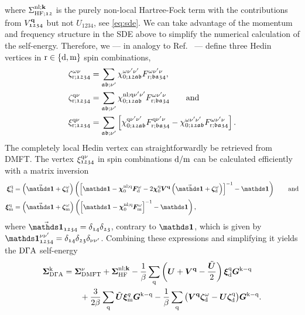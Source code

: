 \documentclass[\main/main.tex]{subfiles}
\begin{document}
where $\Sigma_{\text{HF};\mathfrak{12}}^{\text{nl};\textbf{k}}$ is the purely non-local Hartree-Fock term with the contributions from $V^{\textbf{q}}_{\mathfrak{1234}}$ but not $U_{\mathfrak{1234}}$, see \eqref{eq:sde}. We can take advantage of the momentum and frequency structure in the SDE above to simplify the numerical calculation of the self-energy. Therefore, we --- in analogy to Ref.~\cite{Galler2017} --- define three Hedin vertices in $\text{r}\in\{\text{d},\text{m}\}$ spin combinations,
\begin{align}\label{eq:three_leg_vertices_abinitio_dga}
	\zeta_{\text{r};\mathfrak{1234}}^{\omega\nu}&=\sum_{\mathfrak{ab;\nu'}}\chi_{0;\mathfrak{12ab}}^{\omega\nu'\nu'}F_{\text{r};\mathfrak{ba34}}^{\omega\nu'\nu},\\
	\zeta_{\text{r};\mathfrak{1234}}^{\text{q}\nu}&=\sum_{\mathfrak{ab;\nu'}}\chi_{0;\mathfrak{12ab}}^{\text{nl};\text{q}\nu'\nu'}F_{\text{r};\mathfrak{ba34}}^{\omega\nu'\nu}\qquad\text{and}\\
	\xi_{\text{r};\mathfrak{1234}}^{\text{q}\nu}&=\sum_{\mathfrak{ab;\nu'}}\left [\chi_{0;\mathfrak{12ab}}^{\text{q}\nu'\nu'}F_{\text{r};\mathfrak{ba34}}^{\text{q}\nu'\nu}-\chi_{0;\mathfrak{12ab}}^{\omega\nu'\nu'}F_{\text{r};\mathfrak{ba34}}^{\omega\nu'\nu}\right ].
\end{align}
The completely local Hedin vertex can straightforwardly be retrieved from DMFT. The vertex $\xi_{\mathfrak{1234}}^{\text{q}\nu}$ in spin combinations $\text{d}/\text{m}$ can be calculated efficiently with a matrix inversion
\begin{subequations}
\begin{align}
	\bm\xi_{\dens}^{\q}&=\left (\vec{\bm\unity}+\bm\zeta_{\dens}^{\omega}\right )\left (\left [\bm\unity-\bm\chi_{0}^{\nl;\q}\bm F_{\dens}^{\omega}-2\bm\chi_{0}^{\q}\bm V^{\vv{q}}\left (\vec{\bm\unity}+\bm\zeta_{\dens}^{\omega}\right )\right ]^{-1}-\bm\unity\right )\qqand\\
	\bm\xi_{\magn}^{\q}&=\left (\vec{\bm\unity}+\bm\zeta_{\magn}^{\omega}\right )\left (\left [\bm\unity-\bm\chi_{0}^{\nl;\q}\bm F_{\magn}^{\omega}\right ]^{-1}-\bm\unity\right ),
\end{align}
\end{subequations}
where $\vec{\bm\unity}_{\mathfrak{1234}}=\delta_{\mathfrak{14}}\delta_{\mathfrak{23}}$, contrary to $\bm\unity$, which is given by $\bm\unity_{\mathfrak{1234}}^{\nu\nu'}=\delta_{\mathfrak{14}}\delta_{\mathfrak{23}}\delta_{\nu\nu'}$. Combining these expressions and simplifying it \cite{Galler2017} yields the $\text{D}\Gamma\text{A}$ self-energy
\begin{align}\label{eq:sde_abinitio_dga}
\begin{split}
	\bm\Sigma_{\text{D}\Gamma\text{A}}^{\text{k}}&=\bm\Sigma_{\text{DMFT}}^{\nu}+\bm\Sigma_{\text{HF}}^{\text{nl};\textbf{k}}-\frac1\beta\sum_{\text{q}}\left (\bm U + \bm V^{\textbf{q}}-\frac{\tilde{\bm U}}{2}\right )\bm\xi_{\text{d}}^{\text{q}}\bm G^{\text{k}-\text{q}}\\
	&\qquad+\frac{3}{2\beta}\sum_{\text{q}}\tilde{\bm U}\bm\xi_{\text{m}}^{q}\bm G^{\text{k}-\text{q}}-\frac1\beta\sum_{\text{q}}\big (\bm V^{\textbf{q}}\bm\zeta_{\text{d}}^{\omega}-\bm U\bm\zeta_{\text{d}}^{\text{q}}\big )\bm G^{\text{k}-\text{q}}.
\end{split}
\end{align}
\end{document}
